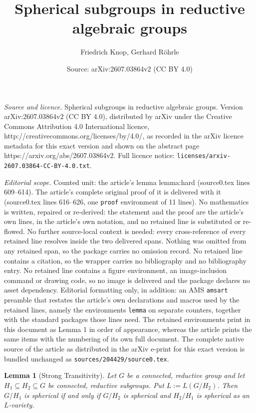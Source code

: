 \documentclass[10pt,a4paper]{amsart}
\title{Spherical subgroups in reductive algebraic groups}
\author{Friedrich Knop, Gerhard Röhrle}
\date{Source: arXiv:2607.03864v2 (CC BY 4.0)}
\newtheorem{lemma}{Lemma}
\begin{document}
\maketitle

\noindent\emph{Source and licence.} Spherical subgroups in reductive algebraic groups. Version arXiv:2607.03864v2 (CC BY 4.0), distributed by arXiv under the Creative Commons Attribution 4.0 International licence, http://creativecommons.org/licenses/by/4.0/, as recorded in the arXiv licence metadata for this exact version and shown on the abstract page https://arxiv.org/abs/2607.03864v2. Full licence notice: \texttt{licenses/arxiv-2607.03864-CC-BY-4.0.txt}.\par\smallskip

\noindent\textit{Editorial scope.} Counted unit: the article's lemma lemma:hard (source0.tex lines 609--614). The article's complete original proof of it is delivered with it (source0.tex lines 616--626, one \texttt{proof} environment of 11 lines). No mathematics is written, repaired or re-derived: the statement and the proof are the article's own lines, in the article's own notation, and no retained line is substituted or re-flowed.  No further source-local context is needed: every cross-reference of every retained line resolves inside the two delivered spans.  Nothing was omitted from any retained span, so the package carries no omission record.  No retained line contains a citation, so the wrapper carries no bibliography and no bibliography entry.  No retained line contains a figure environment, an image-inclusion command or drawing code, so no image is delivered and the package declares no asset dependency.  Editorial formatting only, in addition: an AMS \texttt{amsart} preamble that restates the article's own declarations and macros used by the retained lines, namely the environments \texttt{lemma} on separate counters, together with the standard packages those lines need.  The retained environments print in this document as Lemma 1 in order of appearance, whereas the article prints the same items with the numbering of its own full document.  The complete native source of the article as distributed in the arXiv e-print for this exact version is bundled unchanged as \texttt{sources/204429/source0.tex}.
\begin{lemma}[Strong Transitivity]\label{lemma:hard}
  Let $G$ be a connected, reductive group and let
  $H_1\subseteq H_2\subseteq G$ be connected, reductive subgroups. Put
  $L:=L(G/H_2)$. Then $G/H_1$ is spherical if and only if $G/H_2$ is
  spherical and $H_2/H_1$ is spherical as an $L$-variety.
\end{lemma}
\end{document}
